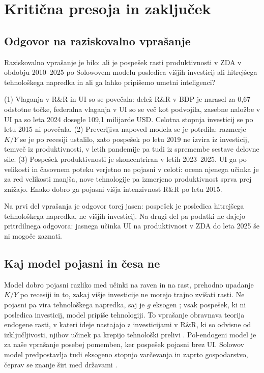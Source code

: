 \documentclass[12pt,a4paper]{article}
\begin{document}
\section{Kritična presoja in zaključek}\label{sec:zakljucek}

\subsection{Odgovor na raziskovalno vprašanje}
Raziskovalno vprašanje je bilo: ali je pospešek rasti produktivnosti v ZDA v obdobju 2010--2025 po Solowovem modelu posledica višjih investicij ali hitrejšega tehnološkega napredka in ali ga lahko pripišemo umetni inteligenci?

(1) Vlaganja v R\&R in UI so se povečala: delež R\&R v BDP je narasel za 0,67 odstotne točke, federalna vlaganja v UI so se več kot podvojila, zasebne naložbe v UI pa so leta 2024 dosegle 109,1 milijarde USD. Celotna stopnja investicij se po letu 2015 ni povečala. (2) Preverljiva napoved modela se je potrdila: razmerje $K/Y$ se je po recesiji ustalilo, zato pospešek po letu 2019 ne izvira iz investicij, temveč iz produktivnosti, v letih pandemije pa tudi iz spremembe sestave delovne sile. (3) Pospešek produktivnosti je skoncentriran v letih 2023--2025. UI ga po velikosti in časovnem poteku verjetno ne pojasni v celoti: ocena njenega učinka je za red velikosti manjša, nove tehnologije pa izmerjeno produktivnost sprva prej znižajo. Enako dobro ga pojasni višja intenzivnost R\&R po letu 2015.

Na prvi del vprašanja je odgovor torej jasen: pospešek je posledica hitrejšega tehnološkega napredka, ne višjih investicij. Na drugi del pa podatki ne dajejo pritrdilnega odgovora: jasnega učinka UI na produktivnost v ZDA do leta 2025 še ni mogoče zaznati.

\subsection{Kaj model pojasni in česa ne}
Model dobro pojasni razliko med učinki na raven in na rast, prehodno upadanje $K/Y$ po recesiji in to, zakaj višje investicije ne morejo trajno zvišati rasti. Ne pojasni pa vira tehnološkega napredka, saj je $g$ eksogen \parencites[pros.~61]{grobovsek2026}[str.~18]{polanec_rast}; vsak pospešek, ki ni posledica investicij, model pripiše tehnologiji. To vprašanje obravnava teorija endogene rasti, v kateri ideje nastajajo z investicijami v R\&R, ki so odvisne od izključljivosti, njihov učinek pa krepijo tehnološki prelivi \parencite[pros.~122--128]{grobovsek2026}. Pol-endogeni model \parencite{jones1995} je za naše vprašanje posebej pomemben, ker pospešek pojasni brez UI. Solowov model predpostavlja tudi eksogeno stopnjo varčevanja \parencite[pros.~86]{grobovsek2026} in zaprto gospodarstvo, čeprav se znanje širi med državami \parencite[str.~31--32]{polanec_rast}.
\end{document}
